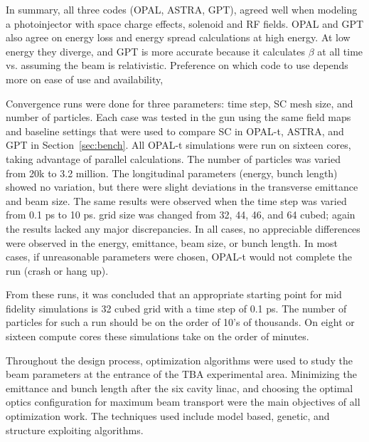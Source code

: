 In summary, all three codes (OPAL, ASTRA, GPT), agreed well when modeling a photoinjector
with space charge effects, solenoid and RF fields.
OPAL and GPT also agree on energy loss and energy spread calculations at high energy.
At low energy they diverge, and GPT is more accurate because it calculates 
$\beta$ at all time vs. assuming the beam is relativistic.
Preference on which code to use depends more on ease of use 
and availability,  


Convergence runs were done for three parameters: 
time step, SC mesh size, and number of particles.  
Each case was tested in the gun using the same field maps and 
baseline settings that were used to compare SC in OPAL-t,  
ASTRA, and GPT in Section~\ref{sec:bench}. 
All OPAL-t simulations were run on 
sixteen cores, taking advantage of parallel calculations. 
The number of particles was varied from 20k to 3.2 million.  
The longitudinal parameters (energy,  bunch length)  
showed no variation, but there were slight deviations 
in the transverse emittance and beam size. The same results 
were observed when the time step was varied from 0.1 ps  to  10  ps.  
 grid size was changed from 32, 44, 46, and 64 cubed; 
again the results lacked any major discrepancies.  
In all cases, no appreciable differences were observed in the energy,
emittance, beam size, or bunch length. In  most  cases,  
if unreasonable  parameters  were chosen, 
OPAL-t would not complete the run (crash or hang up).  

From these runs, it was concluded that an appropriate starting point 
for mid fidelity simulations is 32 cubed grid with a time step
of 0.1 ps. The number of particles for such a run should be on the
order of 10's of thousands. On eight or sixteen compute cores
these simulations take on the order of minutes.

 
 \label{sec:opt}

Throughout the design process, optimization algorithms 
were used to study the beam parameters at the entrance of the TBA experimental area.
Minimizing the emittance and bunch length after the six cavity linac,
and choosing the optimal optics configuration for maximum beam transport 
were the main objectives of all optimization work.
The techniques used include model based, genetic,
and structure exploiting algorithms. 
 
